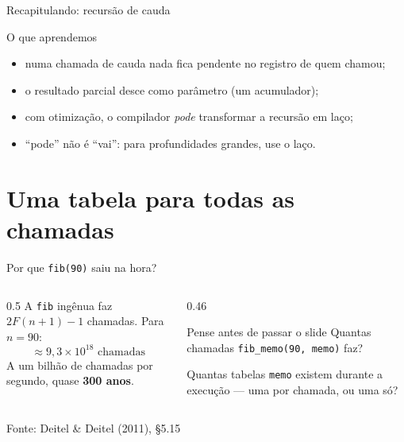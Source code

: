 \documentclass[aspectratio=169]{beamer}
\newcommand{\fonte}[1]{\vfill\hfill{\scriptsize\textcolor{UFSGray}{Fonte: #1}}}
\begin{document}
\begin{frame}{Recapitulando: recursão de cauda}
  \begin{block}{O que aprendemos}
    \begin{itemize}
      \item numa chamada de cauda nada fica pendente no registro de quem
        chamou;
      \item o resultado parcial desce como parâmetro (um acumulador);
      \item com otimização, o compilador \emph{pode} transformar a
        recursão em laço;
      \item ``pode'' não é ``vai'': para profundidades grandes, use o laço.
    \end{itemize}
  \end{block}
\end{frame}

\section{Uma tabela para todas as chamadas}

\begin{frame}{Por que \texttt{fib(90)} saiu na hora?}
  \begin{columns}[c]
    \begin{column}{0.5\textwidth}
      \small
      A \texttt{fib} ingênua faz $2F(n+1) - 1$ chamadas. Para $n = 90$:
      \[
        \approx 9{,}3 \times 10^{18} \text{ chamadas}
      \]
      A um bilhão de chamadas por segundo, quase \textbf{300 anos}.
    \end{column}
    \begin{column}{0.46\textwidth}
      \begin{block}{Pense antes de passar o slide}
        \small Quantas chamadas \texttt{fib\_memo(90, memo)} faz?

        \medskip
        Quantas tabelas \texttt{memo} existem durante a execução --- uma
        por chamada, ou uma só?
      \end{block}
    \end{column}
  \end{columns}
  \fonte{Deitel \& Deitel (2011), §5.15~\cite{deitel2011como}}
\end{frame}
\end{document}
